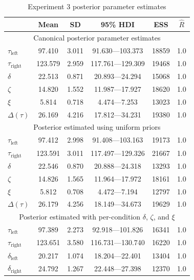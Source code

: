 \documentclass[doc,biblatex]{apa7}
\begin{document}
\begin{table}
\begin{center}
\begin{threeparttable}
\caption{Experiment 3 posterior parameter estimates}
\footnotesize
\begin{tabular}{lccccc}
\toprule
{} &   Mean &     SD &  95\% HDI &  ESS &  $\hat{R}$ \\
\midrule
\multicolumn{6}{c}{Canonical posterior parameter estimates} \\
\midrule
$\tau_\mathrm{left}$  &  97.410 & 3.011 &  91.630---103.373 & 18859 & 1.0 \\
$\tau_\mathrm{right}$ & 123.579 & 2.959 & 117.761---129.309 & 19468 & 1.0 \\
$\delta$              &  22.513 & 0.871 &  20.893---24.294  & 15068 & 1.0 \\
$\zeta$               &  14.820 & 1.552 &  11.987---17.927  & 18620 & 1.0 \\
$\xi$                 &   5.814 & 0.718 &   4.474---7.253   & 13023 & 1.0 \\
$\Delta(\tau)$        &  26.169 & 4.216 &  17.812---34.231  & 19380 & 1.0 \\
\midrule
\multicolumn{6}{c}{Posterior estimated using uniform priors} \\
\midrule
$\tau_\mathrm{left}$  &  97.412 & 2.998 &  91.408---103.163 & 19173 & 1.0 \\
$\tau_\mathrm{right}$ & 123.591 & 3.011 & 117.497---129.326 & 21667 & 1.0 \\
$\delta$              &  22.546 & 0.870 &  20.888---24.318  & 13293 & 1.0 \\
$\zeta$               &  14.826 & 1.565 &  11.964---17.972  & 18161 & 1.0 \\
$\xi$                 &   5.812 & 0.708 &   4.472---7.194   & 12797 & 1.0 \\
$\Delta(\tau)$        &  26.179 & 4.256 &  18.149---34.673  & 19629 & 1.0 \\
\midrule
\multicolumn{6}{c}{Posterior estimated with per-condition $\delta$, $\zeta$, and $\xi$} \\
\midrule
$\tau_\mathrm{left}$    &  97.389 & 2.273 &  92.918---101.826 & 16341 & 1.0 \\
$\tau_\mathrm{right}$   & 123.651 & 3.580 & 116.731---130.740 & 16220 & 1.0 \\
$\delta_\mathrm{left}$  &  20.217 & 1.074 &  18.204---22.401  & 13404 & 1.0 \\
$\delta_\mathrm{right}$ &  24.792 & 1.267 &  22.448---27.398  & 12370 & 1.0 \\

\end{tabular}
\end{threeparttable}
\end{center}
\end{table}
\end{document}
